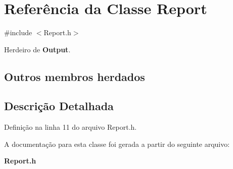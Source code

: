 \section{Referência da Classe Report}
\label{class_report}


{\ttfamily \#include $<$Report.\+h$>$}



Herdeiro de {\bf Output}.

\subsection*{Outros membros herdados}


\subsection{Descrição Detalhada}


Definição na linha 11 do arquivo Report.\+h.



A documentação para esta classe foi gerada a partir do seguinte arquivo\+:\begin{DoxyCompactItemize}
\item 
{\bf Report.\+h}\end{DoxyCompactItemize}
